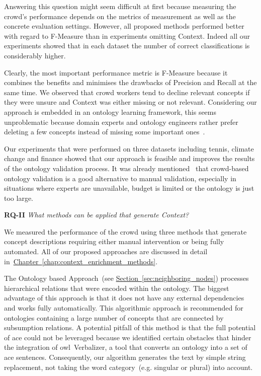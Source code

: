 Answering this question might seem difficult at first because measuring the crowd's performance depends on the metrics of measurement as well as the concrete evaluation settings. However, all proposed methods performed better with regard to F-Measure than in experiments omitting Context. Indeed all our experiments showed that in each dataset the number of correct classifications is considerably higher. 

Clearly, the most important performance metric is F-Measure because it combines the benefits and minimises the drawbacks of Precision and Recall at the same time. We observed that crowd workers tend to decline relevant concepts if they were unsure and Context was either missing or not relevant. Considering our approach is embedded in an ontology learning framework, this seems unproblematic because domain experts and ontology engineers rather prefer deleting a few concepts instead of missing some important ones~\cite{sabou2006}. 

Our experiments that were performed on three datasets including tennis, climate change and finance showed that our approach is feasible and improves the results of the ontology validation process. It was already mentioned~\cite{mortensen2015, mortensen2016, wohlgenannt2016} that crowd-based ontology validation is a good alternative to manual validation, especially in situations where experts are unavailable, budget is limited or the ontology is just too large. 

\textbf{RQ-II} \emph{What methods can be applied that generate Context?}

We measured the performance of the crowd using three methods that generate concept descriptions requiring either manual intervention or being fully automated. All of our proposed approaches are discussed in detail in~\hyperref[chap:context_enrichment_methods]{Chapter~\ref*{chap:context_enrichment_methods}}. 

The Ontology based Approach~(see \hyperref[sec:neighboring_nodes]{Section~\ref*{sec:neighboring_nodes}}) processes hierarchical relations that were encoded within the ontology. The biggest advantage of this approach is that it does not have any external dependencies and works fully automatically. This algorithmic approach is recommended for ontologies containing a large number of concepts that are connected by subsumption relations. A potential pitfall of this method is that the full potential of \gls{ace} could not be leveraged because we identified certain obstacles that hinder the integration of \gls{owl}~Verbalizer, a tool that converts an ontology into a set of \gls{ace} sentences. Consequently, our algorithm generates the text by simple string replacement, not taking the word category~(e.g. singular or plural) into account. 

